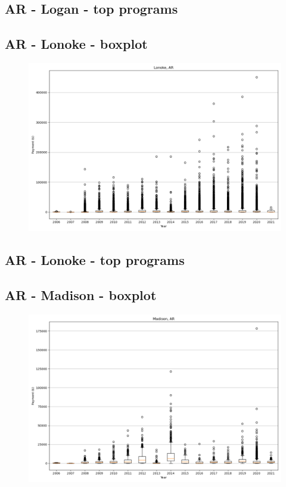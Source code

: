 \subsection*{AR - Logan - top programs}

\newpage
\subsection*{AR - Lonoke - boxplot}
\begin{figure}[h]
\centering
\includegraphics[width=7in]{../output/boxplots/counties/Lonoke-AR_boxplot.png}
\end{figure}


\subsection*{AR - Lonoke - top programs}

\newpage
\subsection*{AR - Madison - boxplot}
\begin{figure}[h]
\centering
\includegraphics[width=7in]{../output/boxplots/counties/Madison-AR_boxplot.png}
\end{figure}


